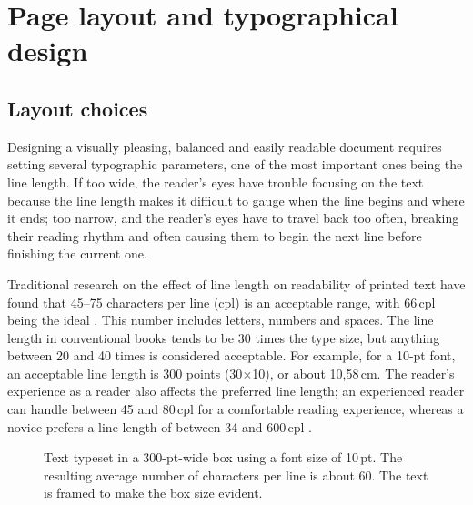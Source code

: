 \documentclass[english, 12pt, a4paper, elec, utf8, a-2b, online]{aaltothesis}
\begin{document}
\clearpage
\section{Page layout and typographical design}
\label{app:layout}

\subsection*{Layout choices}

Designing a visually pleasing, balanced and easily readable document requires 
setting several typographic parameters, one of the most important ones being the
line length. If too wide, the reader’s eyes have trouble focusing on the text 
because the line length makes it difficult to gauge when the line begins and 
where it ends; too narrow, and the reader’s eyes have to travel back too often, 
breaking their reading rhythm and often causing them to begin the next line 
before finishing the current one.

Traditional research on the effect of line length on readability of printed text
have found that 45--75 characters per line (cpl) is an acceptable range, with 
66\,cpl being the ideal \cite{Bringhurst, Wikilinelength}. This number includes 
letters, numbers and spaces. The line length in conventional books tends to be 
30 times the type size, but anything between 20 and 40 times is considered 
acceptable. For example, for a 10-pt font, an acceptable line length is 300 
points (30$\times$10), or about 10,58\,cm. The reader’s experience as a reader 
also affects the preferred line length; an experienced reader can handle between
45 and 80\,cpl for a comfortable reading experience, whereas a novice prefers a 
line length of between 34 and 600\,cpl \cite{Unna}.

\begin{figure}[b]
	\centering
	\caption{Text typeset in a 300-pt-wide box using a font size of 10\,pt. The 
		resulting average number of characters per line is about 60. The text is
		framed to make the box size evident.}
\end{figure}
\end{document}
